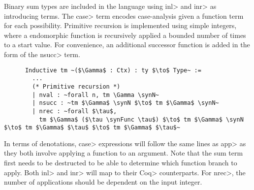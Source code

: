   Binary sum types are included in the language using \<inl> and \<inr> as introducing terms.
  The \<case> term encodes case-analysis given a function term for each possibility.
  Primitive recursion is implemented using simple integers, where a endomorphic function is recursively applied a bounded number of times to a start value.
  For convenience, an additional successor function is added in the form of the \<nsucc> term.

  \begin{listing}
    \begin{verbatim}
      Inductive tm ~($\Gamma$ : Ctx) : ty $\to$ Type~ :=
        ...
        (* Primitive recursion *)
        | nval : ~forall n, tm \Gamma \synN~
        | nsucc : ~tm $\Gamma$ \synN $\to$ tm $\Gamma$ \synN~
        | nrec : ~forall $\tau$,
          tm $\Gamma$ ($\tau \synFunc \tau$) $\to$ tm $\Gamma$ \synN $\to$ tm $\Gamma$ $\tau$ $\to$ tm $\Gamma$ $\tau$~
    \end{verbatim}
    \caption{Terms in our language related to natural number types.}
    \label{lst:stlc_num}
  \end{listing}

  In terms of denotations, \<case> expressions will follow the same lines as \<app> as they both involve applying a function to an argument.
  Note that the sum term first needs to be destructed to be able to determine which function branch to apply.
  Both \<inl> and \<inr> will map to their \<Coq> counterparts.
  For \<nrec>, the number of applications should be dependent on the input integer.

